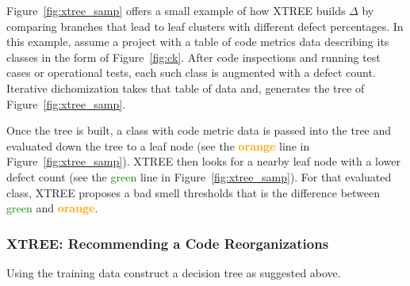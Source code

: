 \documentclass[twocolumn,5p]{elsarticle}
\newcommand{\fig}[1]{Figure~\ref{fig:#1}}
\theoremstyle{break}
\begin{document}
	\fig{xtree_samp} offers
	a small example of how XTREE builds
	$\Delta$ by comparing branches that lead to leaf clusters
	with different defect percentages. In this example, assume a project with a table of code metrics data describing its classes in the form of \fig{ck}. After code inspections and running test cases or operational
	tests, each such class is augmented with a defect count.
	Iterative dichomization takes that table of data and, 
	generates the tree of \fig{xtree_samp}.
	
	Once the tree is built, a class with code metric data is passed into the tree and evaluated down the tree to a leaf node (see the \textcolor{orange}{{\bf orange}} line in \fig{xtree_samp}).
	XTREE then looks for a nearby leaf node with a lower defect
	count (see the \textcolor{green}{{green}} line in \fig{xtree_samp}). For that evaluated class, XTREE proposes a bad smell
	thresholds that is  the difference between 
	\textcolor{green}{{green}} and \textcolor{orange}{{\bf orange}}. 
	
	
	\subsubsection{XTREE: Recommending a Code Reorganizations}
	
	Using the training data construct a decision tree as suggested above.
	
	
\end{document}
